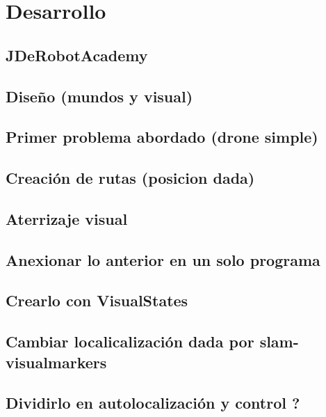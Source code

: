 \chapter{Desarrollo}\label{cap.desarrollo}
\section{JDeRobotAcademy}
\section{Diseño (mundos y visual)}
\section{Primer problema abordado (drone simple)}
\section{Creación de rutas (posicion dada)}
\section{Aterrizaje visual}
\section{Anexionar lo anterior en un solo programa}
\section{Crearlo con VisualStates}
\section{Cambiar localicalización dada por slam-visualmarkers}
\section{Dividirlo en autolocalización y control ?}